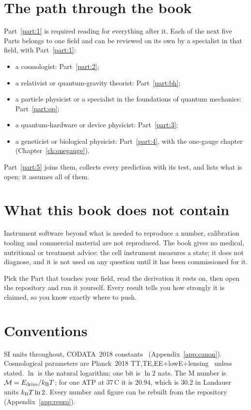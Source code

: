 \section*{The path through the book}
Part~\ref{part:1} is required reading for everything after it. Each of the next five Parts belongs to one field and can be reviewed on its own
by a specialist in that field, with Part~\ref{part:1}:
\begin{itemize}\itemsep0pt
\item a cosmologist: Part~\ref{part:2};
\item a relativist or quantum-gravity theorist: Part~\ref{part:bh};
\item a particle physicist or a specialist in the foundations of quantum mechanics: Part~\ref{part:qp};
\item a quantum-hardware or device physicist: Part~\ref{part:3};
\item a geneticist or biological physicist: Part~\ref{part:4}, with the one-gauge chapter (Chapter~\ref{ch:onegauge}).
\end{itemize}
Part~\ref{part:5} joins them, collects every prediction with its test, and lists what is open; it assumes all of them.

\section*{What this book does not contain}
Instrument software beyond what is needed to reproduce a number, calibration tooling and commercial material are not reproduced. The book gives no
medical, nutritional or treatment advice: the cell instrument measures a state; it does not diagnose, and it is not used on any question until it
has been commissioned for it.

Pick the Part that touches your field, read the derivation it rests on, then open the repository and run it yourself. Every result tells you how strongly it is claimed, so you know exactly where to push.

\section*{Conventions}
SI units throughout, CODATA~2018 constants~\cite{CODATA2018} (Appendix~\ref{app:canon}). Cosmological parameters are Planck~2018
TT,TE,EE+lowE+lensing~\cite{Planck2018VI} unless stated. $\ln$ is the natural logarithm; one bit is $\ln2$ nats. The M number is
$\mathcal M=E_{\rm drive}/k_{\mathrm B} T$; for one ATP at 37\,\textdegree C it is 20.94, which is 30.2 in Landauer units $k_{\mathrm B} T\ln2$. Every number and figure
can be rebuilt from the repository (Appendix~\ref{app:repro}).
